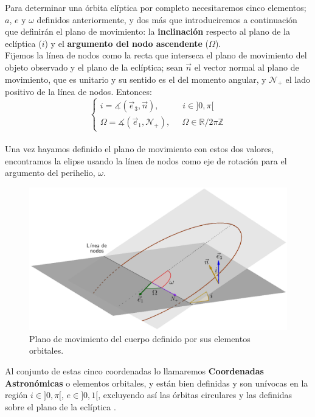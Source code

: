 Para determinar una órbita elíptica por completo necesitaremos cinco elementos; $a$, $e$ y $\omega$ definidos anteriormente, y dos más que introduciremos a continuación que definirán el plano de movimiento: la \textbf{inclinación} respecto al plano de la eclíptica ($i$) y el \textbf{argumento del nodo ascendente} ($\Omega$).\\

Fijemos la línea de nodos como la recta que interseca el plano de movimiento del objeto observado y el plano de la eclíptica; sean $\vec{n}$ el vector normal al plano de movimiento, que es unitario y su sentido es el del momento angular, y $\mathcal{N}_+$ el lado positivo de la línea de nodos. Entonces:
\[
\left\{
\begin{array}{l}
	i=\measuredangle(\vec{e}_3,\vec{n}), \; \; \; \; \; \; \; \; \; \; i\in]0,\pi[\\
	\Omega=\measuredangle(\vec{e}_1, \mathcal{N}_+), \; \; \; \; \; \Omega\in\mathbb{R}/2\pi\mathbb{Z}
\end{array}
\right.
\]\\

Una vez hayamos definido el plano de movimiento con estos dos valores, encontramos la elipse usando la línea de nodos como eje de rotación para el argumento del perihelio, $\omega$.

\begin{figure}[H]
\centering
\includegraphics[scale=0.34]{images/omega_i.png}
\caption{Plano de movimiento del cuerpo definido por sus elementos orbitales.}
\label{fig:omega_i}
\end{figure}

Al conjunto de estas cinco coordenadas lo llamaremos \textbf{Coordenadas Astronómicas} o elementos orbitales, y están bien definidas y son unívocas en la región $i\in]0,\pi[$, $e\in]0,1[$, excluyendo así las órbitas circulares y las definidas sobre el plano de la eclíptica \cite{ortega}.\\


